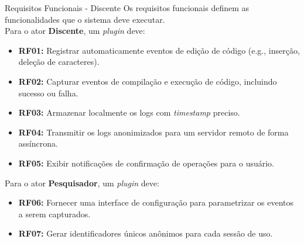\documentclass{if-beamer}
\begin{document}
\begin{frame}{Requisitos Funcionais - Discente}
Os requisitos funcionais definem as funcionalidades que o sistema deve executar.\\ \vspace{0.1in} Para o ator \textbf{Discente}, um \textit{plugin} deve:
\begin{itemize}
    \item \textbf{RF01:} Registrar automaticamente eventos de edição de código (e.g., inserção, deleção de caracteres).
    \item \textbf{RF02:} Capturar eventos de compilação e execução de código, incluindo sucesso ou falha.
    \item \textbf{RF03:} Armazenar localmente os logs com \textit{timestamp} preciso.
    \item \textbf{RF04:} Transmitir os logs anonimizados para um servidor remoto de forma assíncrona.
    \item \textbf{RF05:} Exibir notificações de confirmação de operações para o usuário.
\end{itemize}

Para o ator \textbf{Pesquisador}, um \textit{plugin} deve:
\begin{itemize}
    \item \textbf{RF06:} Fornecer uma interface de configuração para parametrizar os eventos a serem capturados.
    \item \textbf{RF07:} Gerar identificadores únicos anônimos para cada sessão de uso.
\end{itemize}
\end{frame}
\end{document}
